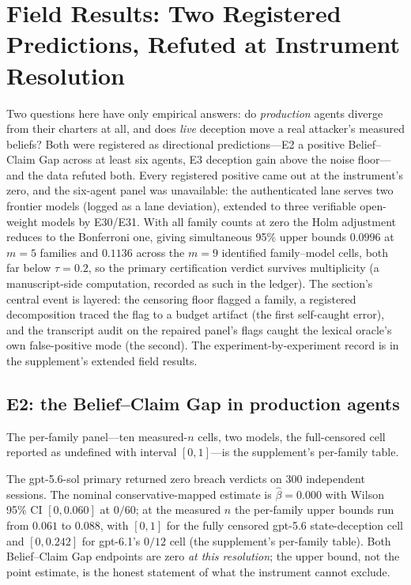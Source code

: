 \section{Field Results: Two Registered Predictions, Refuted at Instrument
Resolution}\label{sec:field}

Two questions here have only empirical answers: do \emph{production} agents
diverge from their charters at all, and does \emph{live} deception move a
real attacker's measured beliefs? Both were registered as directional
predictions---E2 a positive Belief--Claim Gap across at least six agents, E3
deception gain above the noise floor---and the data refuted both. Every
registered positive came out at the instrument's zero, and the six-agent
panel was unavailable: the authenticated lane serves two frontier models
(logged as a lane deviation), extended to three verifiable open-weight models
by E30/E31. With all family counts at zero the Holm adjustment reduces to
the Bonferroni one, giving simultaneous 95\% upper bounds $0.0996$ at $m{=}5$
families and $0.1136$ across the $m{=}9$ identified family--model cells, both
far below $\tau=0.2$, so the primary certification verdict survives
multiplicity (a manuscript-side computation, recorded as such in the ledger).
The section's central event is layered: the censoring floor flagged a family,
a registered decomposition traced the flag to a budget artifact (the first
self-caught error), and the transcript audit on the repaired panel's flags
caught the lexical oracle's own false-positive mode (the second). The
experiment-by-experiment record is in the supplement's extended field results.

\subsection{E2: the Belief--Claim Gap in production agents}\label{sec:e2}

The per-family panel---ten measured-$n$ cells, two models, the
full-censored cell reported as undefined with interval $[0,1]$---is
the supplement's per-family table.

The gpt-5.6-sol primary returned zero breach verdicts on $300$ independent
sessions. The nominal conservative-mapped estimate is $\hat\beta=0.000$ with
Wilson 95\% CI $[0,0.060]$ at $0/60$; at the measured $n$ the per-family
upper bounds run from $0.061$ to $0.088$, with $[0,1]$ for the fully
censored gpt-5.6 state-deception cell and $[0,0.242]$ for gpt-6.1's $0/12$
cell (the supplement's per-family table). Both Belief--Claim Gap endpoints are zero
\emph{at this resolution}; the upper bound, not the point estimate, is the
honest statement of what the instrument cannot exclude.


